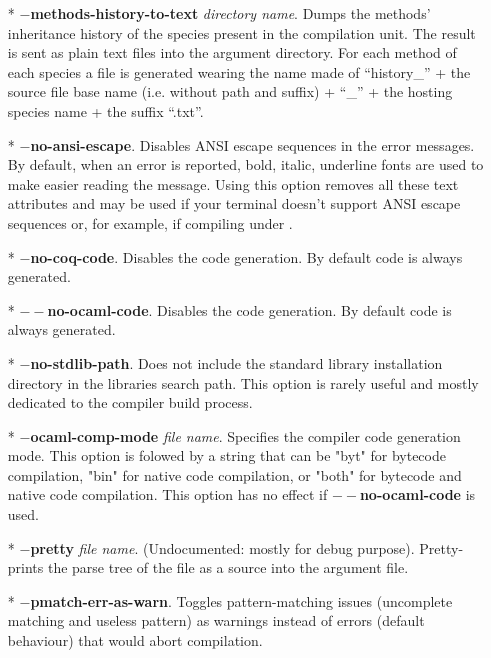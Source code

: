 \begin{itemize}
 \item[*] {\bf $-$methods-history-to-text} {\em directory
   name}. Dumps the methods' inheritance history of the species
   present in the compilation unit. The result is sent as plain text files
   into the argument directory. For each method of each species a file
   is generated wearing the name made of ``history\_'' + the source
   file base name (i.e. without path and suffix) + ``\_'' + the
   hosting species name + the suffix ``.txt''.

  \item[*] {\bf $-$no-ansi-escape}. Disables ANSI escape sequences in
    the error messages. By default, when an error is reported, bold,
    italic, underline fonts are used to make easier reading the
    message. Using this option removes all these text attributes and
    may be used if your terminal doesn't support ANSI escape sequences
    or, for example, if compiling under \emacs.

  \item[*] {\bf $-$no-coq-code}. Disables the {\coq} code
    generation. By default {\coq} code is always generated.

  \item[*] {\bf $--$no-ocaml-code}. Disables the {\ocaml} code
    generation. By default {\ocaml} code is always generated.

   \item[*] {\bf $-$no-stdlib-path}. Does not include the standard
    library installation directory in the libraries search path. This
    option is rarely useful and mostly dedicated to the
    {\focal} compiler build process.

   \item[*] {\bf $-$ocaml-comp-mode} {\em file name}. Specifies the
     {\ocaml} compiler code generation mode. This option is folowed by
     a string that can be "byt" for bytecode compilation, "bin" for
     native code compilation, or "both" for bytecode and native code
     compilation. This option has no effect if {\bf $--$no-ocaml-code}
     is used.

  \item[*] {\bf $-$pretty} {\em file name}. (Undocumented: mostly for
    debug purpose). Pretty-prints the parse tree of the {\focal} file
    as a {\focal} source into the argument file.

  \item[*] {\bf $-$pmatch-err-as-warn}. Toggles pattern-matching issues
    (uncomplete matching and useless pattern) as warnings instead of
    errors (default behaviour) that would abort compilation.


\end{itemize}
